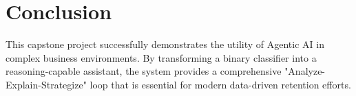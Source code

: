 \documentclass[a4paper,12pt]{article}
\begin{document}
\section{Conclusion}
This capstone project successfully demonstrates the utility of Agentic AI in complex business environments. By transforming a binary classifier into a reasoning-capable assistant, the system provides a comprehensive "Analyze-Explain-Strategize" loop that is essential for modern data-driven retention efforts.
\end{document}

